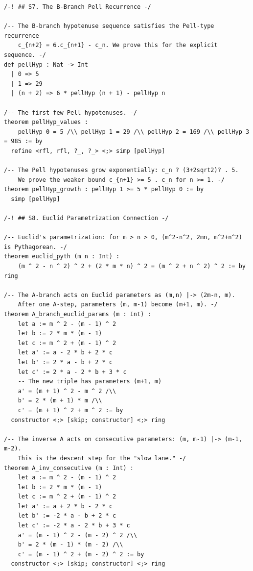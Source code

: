 \documentclass[11pt,openright,twoside]{book}
\theoremstyle{definition}
\begin{document}
\begin{lstlisting}[style=lean]
/-! ## S7. The B-Branch Pell Recurrence -/

/-- The B-branch hypotenuse sequence satisfies the Pell-type recurrence
    c_{n+2} = 6.c_{n+1} - c_n. We prove this for the explicit sequence. -/
def pellHyp : Nat -> Int
  | 0 => 5
  | 1 => 29
  | (n + 2) => 6 * pellHyp (n + 1) - pellHyp n

/-- The first few Pell hypotenuses. -/
theorem pellHyp_values :
    pellHyp 0 = 5 /\\ pellHyp 1 = 29 /\\ pellHyp 2 = 169 /\\ pellHyp 3 = 985 := by
  refine <rfl, rfl, ?_, ?_> <;> simp [pellHyp]

/-- The Pell hypotenuses grow exponentially: c_n ? (3+2sqrt2)? . 5.
    We prove the weaker bound c_{n+1} >= 5 . c_n for n >= 1. -/
theorem pellHyp_growth : pellHyp 1 >= 5 * pellHyp 0 := by
  simp [pellHyp]

/-! ## S8. Euclid Parametrization Connection -/

/-- Euclid's parametrization: for m > n > 0, (m^2-n^2, 2mn, m^2+n^2) is Pythagorean. -/
theorem euclid_pyth (m n : Int) :
    (m ^ 2 - n ^ 2) ^ 2 + (2 * m * n) ^ 2 = (m ^ 2 + n ^ 2) ^ 2 := by ring

/-- The A-branch acts on Euclid parameters as (m,n) |-> (2m-n, m).
    After one A-step, parameters (m, m-1) become (m+1, m). -/
theorem A_branch_euclid_params (m : Int) :
    let a := m ^ 2 - (m - 1) ^ 2
    let b := 2 * m * (m - 1)
    let c := m ^ 2 + (m - 1) ^ 2
    let a' := a - 2 * b + 2 * c
    let b' := 2 * a - b + 2 * c
    let c' := 2 * a - 2 * b + 3 * c
    -- The new triple has parameters (m+1, m)
    a' = (m + 1) ^ 2 - m ^ 2 /\\
    b' = 2 * (m + 1) * m /\\
    c' = (m + 1) ^ 2 + m ^ 2 := by
  constructor <;> [skip; constructor] <;> ring

/-- The inverse A acts on consecutive parameters: (m, m-1) |-> (m-1, m-2).
    This is the descent step for the "slow lane." -/
theorem A_inv_consecutive (m : Int) :
    let a := m ^ 2 - (m - 1) ^ 2
    let b := 2 * m * (m - 1)
    let c := m ^ 2 + (m - 1) ^ 2
    let a' := a + 2 * b - 2 * c
    let b' := -2 * a - b + 2 * c
    let c' := -2 * a - 2 * b + 3 * c
    a' = (m - 1) ^ 2 - (m - 2) ^ 2 /\\
    b' = 2 * (m - 1) * (m - 2) /\\
    c' = (m - 1) ^ 2 + (m - 2) ^ 2 := by
  constructor <;> [skip; constructor] <;> ring


\end{lstlisting}
\end{document}
